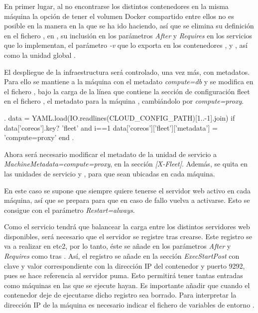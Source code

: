 En primer lugar, al no encontrarse los distintos contenedores en la misma máquina la opción de tener el volumen Docker  compartido entre ellos no es posible en la manera en la que se ha ido haciendo, así que se elimina su definición en el fichero , en , su inclusión en los parámetros \textit{After} y \textit{Requires} en los servicios que lo implementan, el parámetro \textit{-v} que lo exporta en los contenedores ,  y , así como la unidad global .

El despliegue de la infraestructura será controlado, una vez más, con metadatos. Para ello se mantiene a la máquina  con el metadato \textit{compute=db} y se modifica en el fichero , bajo la carga de la línea que contiene la sección de configuración fleet en el fichero , el metadato para la máquina , cambiándolo por \textit{compute=proxy}.

\begin{codelisting}
\label{code:vagrantfile2}
\begin{code}
.
data = YAML.load(IO.readlines(CLOUD_CONFIG_PATH)[1..-1].join)
if data['coreos'].key? 'fleet' and i==1
 data['coreos']['fleet']['metadata'] = 'compute=proxy'
end
.
\end{code}
\end{codelisting}

Ahora será necesario modificar el metadato de la unidad de servicio  a \textit{MachineMetadata=compute=proxy}, en la sección \textit{[X-Fleet]}. Además, se quita  en las unidades de servicio  y , para que sean ubicadas en cada máquina.

En este caso se supone que siempre quiere tenerse el servidor web  activo en cada máquina, así que se prepara para que en caso de fallo vuelva a activarse. Esto se consigue con el parámetro \textit{Restart=always}.

Como el servicio  tendrá que balancear la carga entre los distintos servidores web disponibles, será necesario que el servidor  se registre tras crearse. Este registro se va a realizar en etc2, por lo tanto, éste se añade en los parámetros \textit{After} y \textit{Requires} como  tras . Así, el registro se añade en la sección \textit{ExecStartPost} con clave  y valor correspondiente con la dirección IP del contenedor y puerto 9292, pues se hace referencia al servidor puma. Esto permitirá tener tantas entradas  como máquinas en las que se ejecute hayan. Es importante añadir que cuando el contenedor deje de ejecutarse dicho registro sea borrado. Para interpretar la dirección IP de la máquina es necesario indicar el fichero de variables de entorno . 

